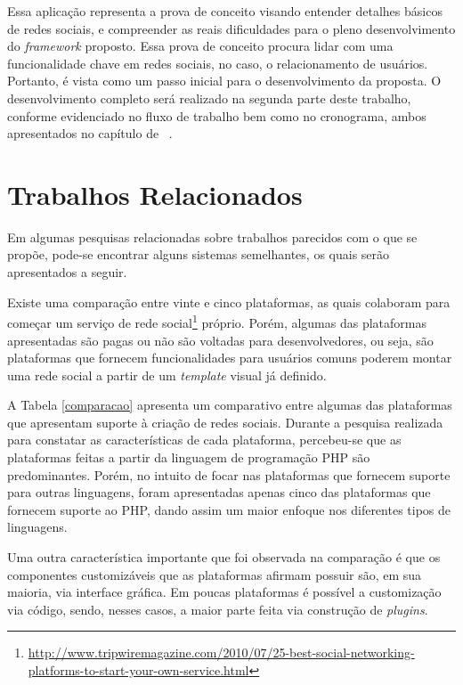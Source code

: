 Essa aplicação representa a prova de conceito visando entender detalhes básicos de redes sociais, e compreender as reais dificuldades para o pleno desenvolvimento do \textit{framework} proposto. Essa prova de conceito procura lidar com uma funcionalidade chave em redes sociais, no caso, o relacionamento de usuários. Portanto, é vista como um passo inicial para o desenvolvimento da proposta. O desenvolvimento completo será realizado na segunda parte deste trabalho, conforme evidenciado no fluxo de trabalho bem como no cronograma, ambos apresentados no capítulo de ~.

\section{Trabalhos Relacionados}

Em algumas pesquisas relacionadas sobre trabalhos parecidos com o que se propõe, pode-se encontrar alguns sistemas semelhantes, os quais serão apresentados a seguir.

Existe uma comparação entre vinte e cinco plataformas, as quais colaboram para começar um serviço de rede social\footnote{\url{http://www.tripwiremagazine.com/2010/07/25-best-social-networking-platforms-to-start-your-own-service.html}}  próprio. Porém, algumas das plataformas apresentadas são pagas ou não são voltadas para desenvolvedores, ou seja, são plataformas que fornecem funcionalidades para usuários comuns poderem montar uma rede social a partir de um \textit{template} visual já definido.

A Tabela \ref{comparacao} apresenta um comparativo entre algumas das plataformas que apresentam suporte à criação de redes sociais. Durante a pesquisa realizada para constatar as características de cada plataforma, percebeu-se que as plataformas feitas a partir da linguagem de programação PHP são predominantes. Porém, no intuito de focar nas plataformas que fornecem suporte para outras linguagens, foram apresentadas apenas cinco das plataformas que fornecem suporte ao PHP, dando assim um maior enfoque nos diferentes tipos de linguagens.

Uma outra característica importante que foi observada na comparação é que os componentes customizáveis que as plataformas afirmam possuir são, em sua maioria, via interface gráfica. Em poucas plataformas é possível a customização via código, sendo, nesses casos, a maior parte feita via construção de \textit{plugins}.

\newpage


